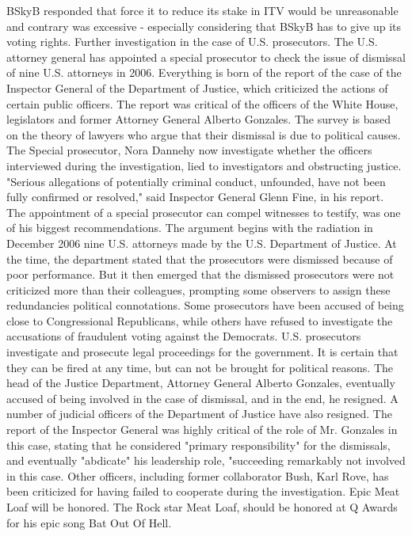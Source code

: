 BSkyB responded that force it to reduce its stake in ITV would be unreasonable and contrary was excessive - especially considering that BSkyB has to give up its voting rights.
Further investigation in the case of U.S. prosecutors.
The U.S. attorney general has appointed a special prosecutor to check the issue of dismissal of nine U.S. attorneys in 2006.
Everything is born of the report of the case of the Inspector General of the Department of Justice, which criticized the actions of certain public officers.
The report was critical of the officers of the White House, legislators and former Attorney General Alberto Gonzales.
The survey is based on the theory of lawyers who argue that their dismissal is due to political causes.
The Special prosecutor, Nora Dannehy now investigate whether the officers interviewed during the investigation, lied to investigators and obstructing justice.
"Serious allegations of potentially criminal conduct, unfounded, have not been fully confirmed or resolved," said Inspector General Glenn Fine, in his report.
The appointment of a special prosecutor can compel witnesses to testify, was one of his biggest recommendations.
The argument begins with the radiation in December 2006 nine U.S. attorneys made by the U.S. Department of Justice.
At the time, the department stated that the prosecutors were dismissed because of poor performance.
But it then emerged that the dismissed prosecutors were not criticized more than their colleagues, prompting some observers to assign these redundancies political connotations.
Some prosecutors have been accused of being close to Congressional Republicans, while others have refused to investigate the accusations of fraudulent voting against the Democrats.
U.S. prosecutors investigate and prosecute legal proceedings for the government.
It is certain that they can be fired at any time, but can not be brought for political reasons.
The head of the Justice Department, Attorney General Alberto Gonzales, eventually accused of being involved in the case of dismissal, and in the end, he resigned.
A number of judicial officers of the Department of Justice have also resigned.
The report of the Inspector General was highly critical of the role of Mr. Gonzales in this case, stating that he considered "primary responsibility" for the dismissals, and eventually "abdicate" his leadership role, "succeeding remarkably not involved in this case.
Other officers, including former collaborator Bush, Karl Rove, has been criticized for having failed to cooperate during the investigation.
Epic Meat Loaf will be honored.
The Rock star Meat Loaf, should be honored at Q Awards for his epic song Bat Out Of Hell.
